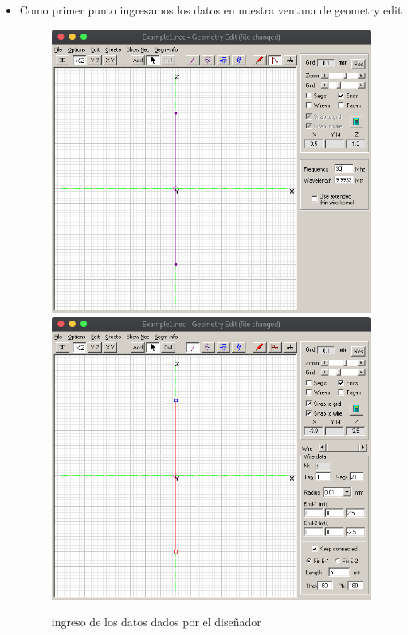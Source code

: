 \documentclass[11pt,a4paper]{article}
\begin{document}
\begin{itemize}
    \item Como primer punto ingresamos los datos en nuestra ventana de geometry edit
    
    \begin{figure}[H]
    \centering
    \includegraphics[scale=0.35]{images/dipolo/dipolo1.png}
    \includegraphics[scale=0.35]{images/dipolo/dipolo2.png}
    \caption{ingreso de los datos dados por el diseñador}
    \label{fig3:yagui2d}
    \end{figure}
    
\end{itemize}
\end{document}
